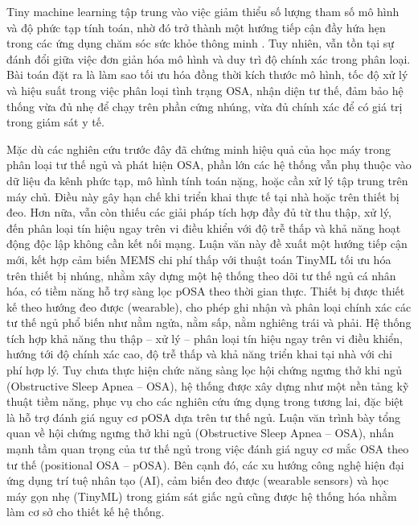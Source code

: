 Tiny machine learning tập trung vào việc giảm thiểu số lượng tham số mô hình và độ phức tạp tính toán, 
nhờ đó trở thành một hướng tiếp cận đầy hứa hẹn trong các ứng dụng chăm 
sóc sức khỏe thông minh \cite{ray2021tinyml,diab2022embedded}. 
Tuy nhiên, vẫn tồn tại sự đánh đổi giữa việc đơn giản hóa mô hình và 
duy trì độ chính xác trong phân loại. Bài toán đặt ra là làm sao tối 
ưu hóa đồng thời kích thước mô hình, tốc độ xử lý và hiệu suất trong việc phân loại tình trạng OSA, nhận diện tư thế, 
đảm bảo hệ thống vừa đủ nhẹ để chạy trên phần cứng nhúng, vừa đủ chính xác để có giá trị trong giám sát y tế.




Mặc dù các nghiên cứu trước đây đã chứng minh hiệu quả của học máy trong phân loại tư thế ngủ và phát hiện OSA, 
phần lớn các hệ thống vẫn phụ thuộc vào dữ liệu đa kênh phức tạp, mô hình tính toán nặng, 
hoặc cần xử lý tập trung trên máy chủ. Điều này gây hạn chế khi triển khai thực tế 
tại nhà hoặc trên thiết bị đeo. Hơn nữa, vẫn còn thiếu các giải pháp tích hợp đầy đủ từ thu thập, 
xử lý, đến phân loại tín hiệu ngay trên vi điều khiển 
với độ trễ thấp và khả năng hoạt động độc lập không cần kết nối mạng. 
Luận văn này đề xuất một hướng tiếp cận mới, kết hợp cảm biến MEMS chi phí thấp với thuật toán TinyML tối ưu hóa trên thiết bị nhúng, nhằm xây dựng một hệ thống theo dõi tư thế ngủ cá nhân hóa, có tiềm năng hỗ trợ sàng lọc pOSA theo thời gian thực.
Thiết bị được thiết kế theo hướng đeo được (wearable), 
cho phép ghi nhận và phân loại chính xác các tư thế 
ngủ phổ biến như nằm ngửa, nằm sấp, nằm nghiêng trái và phải. 
Hệ thống tích hợp khả năng thu thập – xử lý – phân loại tín 
hiệu ngay trên vi điều khiển, hướng tới độ chính xác cao, 
độ trễ thấp và khả năng triển khai tại nhà với chi phí hợp lý. 
Tuy chưa thực hiện chức năng sàng lọc hội chứng ngưng thở khi ngủ (Obstructive Sleep Apnea – OSA), 
hệ thống được xây dựng như một nền tảng kỹ thuật tiềm năng, phục vụ cho các nghiên cứu ứng dụng trong tương lai, 
đặc biệt là hỗ trợ đánh giá nguy cơ pOSA dựa trên tư thế ngủ.
Luận văn trình bày tổng quan về hội chứng ngưng thở khi ngủ (Obstructive Sleep Apnea – OSA), 
nhấn mạnh tầm quan trọng của tư thế ngủ trong việc đánh giá nguy cơ mắc OSA theo tư thế (positional OSA – pOSA). 
Bên cạnh đó, các xu hướng công nghệ hiện đại ứng dụng trí tuệ nhân tạo (AI), 
cảm biến đeo được (wearable sensors) và học máy gọn nhẹ (TinyML) 
trong giám sát giấc ngủ cũng được hệ thống hóa nhằm làm 
cơ sở cho thiết kế hệ thống.

